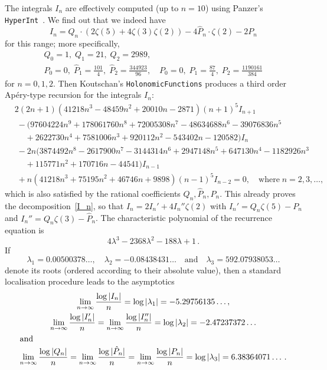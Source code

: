 \documentclass[12pt,reqno]{amsart}
\theoremstyle{remark}
\begin{document}
The integrals $I_n$ are effectively computed (up to $n=10$) using Panzer's \texttt{Hyper\-Int}~\cite{Pa15}.
We find out that we indeed have
\begin{equation}
I_n=Q_n\cdot(2\zeta(5)+4\zeta(3)\zeta(2))-4\hat P_n\cdot\zeta(2)-2P_n
\label{I_n}
\end{equation}
for this range; more specifically,
\begin{gather*}
Q_0=1, \; Q_1=21, \; Q_2=2989, \\
\hat P_0=0, \; \hat P_1=\frac{101}4, \; \hat P_2=\frac{344923}{96}, \quad
P_0=0, \; P_1=\frac{87}4, \; P_2=\frac{1190161}{384}
\end{gather*}
for $n=0,1,2$.
Then Koutschan's \texttt{HolonomicFunctions} \cite{Ko10} produces a third order Ap\'ery-type recursion for the integrals $I_n$:
\begin{align*}
&
2(2n + 1)(41218n^3 - 48459n^2 + 20010n - 2871)(n + 1)^5 I_{n+1}
\\ &\;
-(97604224n^9 + 178061760n^8 + 72005308n^7 - 48634688n^6 - 39076836n^5
\\ &\;\quad
+ 2622730n^4 + 7581006n^3 + 920112n^2 - 543402n - 120582) I_n
\\ &\;
-2n(3874492n^8 - 2617900n^7 - 3144314n^6 + 2947148n^5 + 647130n^4 - 1182926n^3
\\ &\;\quad
+ 115771n^2 + 170716n - 44541) I_{n-1}
\\ &\;
+n(41218n^3 + 75195n^2 + 46746n + 9898)(n - 1)^5 I_{n-2}
=0,
\quad\text{where}\; n=2,3,\dots,
\end{align*}
which is also satisfied by the rational coefficients $Q_n,\hat P_n,P_n$.
This already proves the decomposition~\eqref{I_n}, so that $I_n=2I_n'+4I_n''\zeta(2)$ with $I_n'=Q_n\zeta(5)-P_n$ and $I_n''=Q_n\zeta(3)-\hat P_n$.
The characteristic polynomial of the recurrence equation is
\begin{equation*}
4\lambda^3 - 2368\lambda^2 - 188\lambda + 1 \,. 
\end{equation*}
If
\[
\lambda_1=0.00500378\hdots, \quad \lambda_2=-0.08438431\hdots \quad\text{and}\quad \lambda_3=592.07938053\hdots
\]
denote its roots (ordered according to their absolute value), then a standard localisation procedure leads to the asymptotics
\begin{gather*}
\lim_{n\to\infty}\frac{\log|I_n|}n=\log|\lambda_1|=-5.29756135\dots,
\\
\lim_{n\to\infty}\frac{\log|I_n'|}n=\lim_{n\to\infty}\frac{\log|I_n''|}n=\log|\lambda_2|=-2.47237372\dots
\\ \intertext{and}
\lim_{n\to\infty}\frac{\log|Q_n|}n=\lim_{n\to\infty}\frac{\log|\hat P_n|}n=\lim_{n\to\infty}\frac{\log|P_n|}n
=\log|\lambda_3|=6.38364071\dotsc.
\end{gather*}
\end{document}
